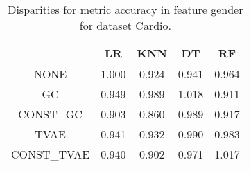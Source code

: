 \begin{table}
\caption{Disparities for metric accuracy in feature gender for dataset Cardio.}
\label{tab:disp-CARDIO-gender-accuracy}
\begin{tabular}{ccccc}
\toprule
 & LR & KNN & DT & RF \\
\midrule
NONE & 1.000 & 0.924 & 0.941 & 0.964 \\
GC & 0.949 & 0.989 & 1.018 & 0.911 \\
CONST\_GC & 0.903 & 0.860 & 0.989 & 0.917 \\
TVAE & 0.941 & 0.932 & 0.990 & 0.983 \\
CONST\_TVAE & 0.940 & 0.902 & 0.971 & 1.017 \\
\bottomrule
\end{tabular}
\end{table}
